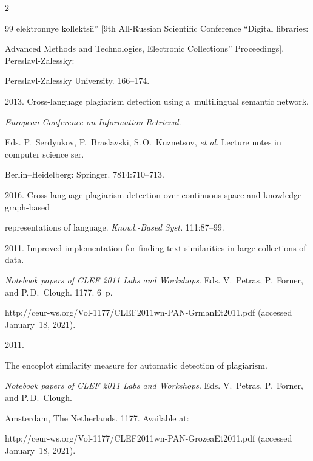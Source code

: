 \begin{multicols}{2}
{{\begin{thebibliography}{99}
{elektronnye kollektsii''} [9th All-Russian Scientific Conference ``Digital libraries: 


Advanced Methods and Technologies, Electronic Collections'' Proceedings]. Pereslavl-Zalessky:


Pereslavl-Zalessky University. 166--174.






 2013. Cross-language plagiarism detection using a~multilingual semantic network. 


 \textit{European Conference on Information Retrieval}. 


 Eds. P.~Serdyukov, P.~Braslavski, S.\,O.~Kuznetsov, \textit{et al}. Lecture notes in computer science ser. 


 Berlin--Heidelberg: Springer. 7814:710--713.






 2016. Cross-language plagiarism detection over continuous-space-and knowledge graph-based 


 representations of language. \textit{Knowl.-Based Syst.} 111:87--99.






 2011. Improved implementation for finding text similarities in large collections of data.


 \textit{Notebook papers of CLEF 2011 Labs and Workshops}.  Eds. V.~Petras, P.~Forner, and P.\,D.~Clough. 1177. 6~p.


 {\sf http://ceur-ws.org/Vol-1177/CLEF2011wn-PAN-GrmanEt2011.pdf} (accessed January~18, 2021).




 2011. 


The encoplot similarity measure for automatic detection of plagiarism. 


\textit{Notebook papers of CLEF 2011 Labs and Workshops}.  Eds. V.~Petras, P.~Forner, and P.\,D.~Clough.


Amsterdam, The Netherlands. 1177. Available at: 


{\sf http://ceur-ws.org/\linebreak  Vol-1177/CLEF2011wn-PAN-GrozeaEt2011.pdf} (accessed January~18, 2021).



\end{thebibliography}}}
\end{multicols}
